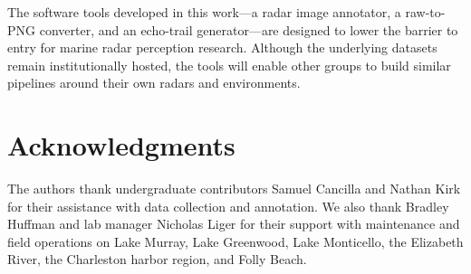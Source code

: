 \documentclass[conference]{IEEEtran}
\begin{document}
The software tools developed in this work---a radar image annotator, a raw-to-PNG converter, and an echo-trail generator---are designed to lower the barrier to entry for marine radar perception research. Although the underlying datasets remain institutionally hosted, the tools will enable other groups to build similar pipelines around their own radars and environments.


\section*{Acknowledgments}
The authors thank undergraduate contributors Samuel Cancilla and Nathan Kirk for their assistance with data collection and annotation. We also thank Bradley Huffman and lab manager Nicholas Liger for their support with maintenance and field operations on Lake Murray, Lake Greenwood, Lake Monticello, the Elizabeth River, the Charleston harbor region, and Folly Beach. 



\end{document}
